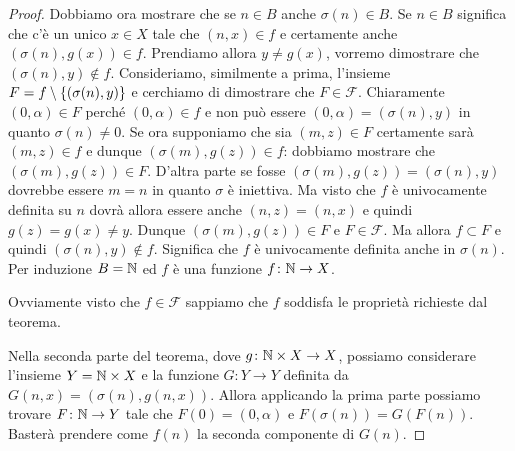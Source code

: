 \begin{proof}
Dobbiamo ora mostrare che se $n\in B$ anche $\sigma(n)\in B$.
Se $n\in B$ significa che c'è un unico $x\in X$ tale che $(n,x)\in f$
e certamente anche $(\sigma(n),g(x))\in f$.
Prendiamo allora $y\neq g(x)$, vorremo dimostrare che $(\sigma(n),y)\not \in f$.
Consideriamo, similmente a prima, l'insieme $F=f\setminus{\left\{ (\sigma(n),y) \right\}}$
e cerchiamo di dimostrare che $F\in \mathcal F$.
Chiaramente $(0,\alpha)\in F$ perché $(0,\alpha)\in f$ 
e non può essere $(0,\alpha)=(\sigma(n),y)$ in quanto $\sigma(n)\neq 0$.
Se ora supponiamo che sia $(m,z)\in F$ certamente sarà $(m,z)\in f$ 
e dunque $(\sigma(m),g(z))\in f$: 
dobbiamo mostrare che $(\sigma(m),g(z))\in F$. 
D'altra parte se fosse $(\sigma(m), g(z))=(\sigma(n),y)$ 
dovrebbe essere $m=n$ in quanto $\sigma$ è iniettiva. 
Ma visto che $f$ è univocamente definita su $n$ dovrà allora essere 
anche $(n,z) = (n,x)$ e quindi $g(z)=g(x) \neq y$. 
Dunque $(\sigma(m),g(z))\in F$ e $F\in \mathcal F$.
Ma allora $f\subset F$ e quindi $(\sigma(n),y)\not \in f$.
Significa che $f$ è univocamente definita anche in $\sigma(n)$.
Per induzione $B={\mathbb N}$ ed $f$ è una funzione $f\colon {\mathbb N}\to X$.

Ovviamente visto che $f\in \mathcal F$ sappiamo che $f$ 
soddisfa le proprietà richieste dal teorema.

Nella seconda parte del teorema, dove $g\colon {\mathbb N}\times X \to X$,
possiamo considerare l'insieme $Y={\mathbb N}\times X$ e la funzione 
$G\colon Y\to Y$ definita da $G(n,x) = (\sigma(n), g(n,x))$.
Allora applicando la prima parte possiamo trovare $F\colon {\mathbb N}\to Y$
tale che $F(0) = (0,\alpha)$ e $F(\sigma(n)) = G(F(n))$.
Basterà prendere come $f(n)$ la seconda componente di $G(n)$.
\end{proof}

